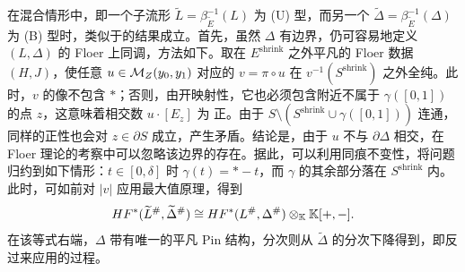 \begin{note}\label{st:18.11}
在混合情形中，即一个子流形 $\widetilde L=\beta_{\widetilde E}^{-1}(L)$ 为 (U) 型，而另一个 $\widetilde\Delta=\beta_{\widetilde E}^{-1}(\Delta)$ 为 (B) 型时，类似于的结果成立。首先，虽然 $\Delta$ 有边界，仍可容易地定义 $(L,\Delta)$ 的 Floer 上同调，方法如下。取在 $E^{\mathrm{shrink}}$ 之外平凡的 Floer 数据 $(H,J)$，使任意 $u\in\mathcal M_Z(y_0,y_1)$ 对应的 $v=\pi\circ u$ 在 $v^{-1}(S^{\mathrm{shrink}})$ 之外全纯。此时，$v$ 的像不包含 $*$；否则，由开映射性，它也必须包含附近不属于 $\gamma([0,1])$ 的点 $z$，这意味着相交数 $u\cdot[E_z]$ 为
正。由于 $S\setminus(S^{\mathrm{shrink}}\cup\gamma([0,1]))$ 连通，同样的正性也会对 $z\in\partial S$ 成立，产生矛盾。结论是，由于 $u$ 不与 $\partial\Delta$ 相交，在 Floer 理论的考察中可以忽略该边界的存在。据此，可以利用同痕不变性，将问题归约到如下情形：$t\in[0,\delta]$ 时 $\gamma(t)=*-t$，而 $\gamma$ 的其余部分落在 $S^{\mathrm{shrink}}$ 内。此时，可如前对 $|v|$ 应用最大值原理，得到
\[
HF^*(\widetilde L^\#,\widetilde\Delta^\#)\cong HF^*(L^\#,\Delta^\#)\otimes_{\mathbb K}\mathbb K[+,-].
\]
在该等式右端，$\Delta$ 带有唯一的平凡 Pin 结构，分次则从 $\widetilde\Delta$ 的分次下降得到，即反过来应用的过程。
\end{note}
